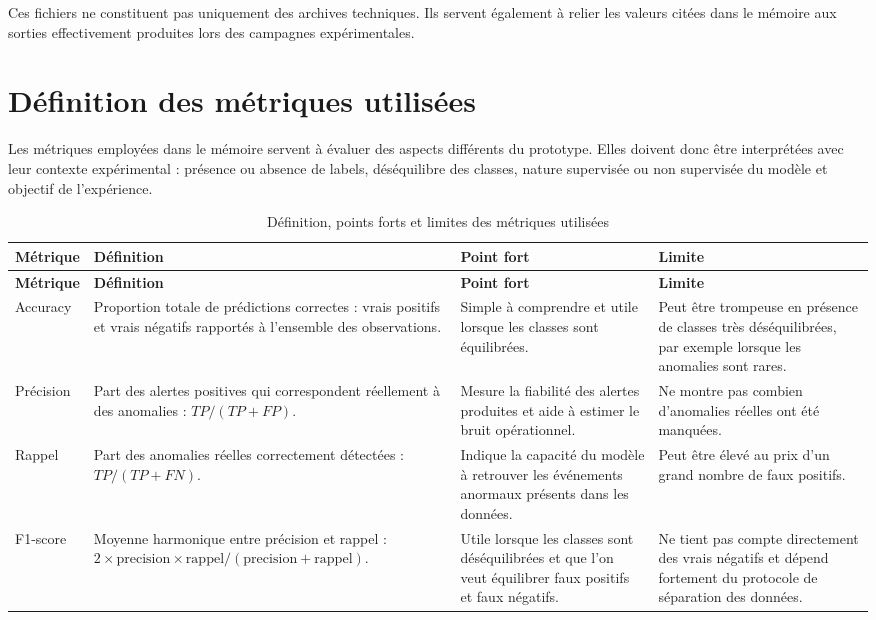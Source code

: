 Ces fichiers ne constituent pas uniquement des archives techniques. Ils servent également à relier les valeurs citées dans le mémoire aux sorties effectivement produites lors des campagnes expérimentales.


\section{Définition des métriques utilisées}

Les métriques employées dans le mémoire servent à évaluer des aspects différents du prototype. Elles doivent donc être interprétées avec leur contexte expérimental : présence ou absence de labels, déséquilibre des classes, nature supervisée ou non supervisée du modèle et objectif de l'expérience.

\begin{longtable}{p{2.7cm}p{4.1cm}p{3.6cm}p{3.6cm}}

\caption{Définition, points forts et limites des métriques utilisées}
\label{tab:definition-metriques}\\

\toprule
\textbf{Métrique} &
\textbf{Définition} &
\textbf{Point fort} &
\textbf{Limite} \\
\midrule
\endfirsthead

\toprule
\textbf{Métrique} &
\textbf{Définition} &
\textbf{Point fort} &
\textbf{Limite} \\
\midrule
\endhead

Accuracy &
Proportion totale de prédictions correctes : vrais positifs et vrais négatifs rapportés à l'ensemble des observations. &
Simple à comprendre et utile lorsque les classes sont équilibrées. &
Peut être trompeuse en présence de classes très déséquilibrées, par exemple lorsque les anomalies sont rares. \\

Précision &
Part des alertes positives qui correspondent réellement à des anomalies : $TP/(TP+FP)$. &
Mesure la fiabilité des alertes produites et aide à estimer le bruit opérationnel. &
Ne montre pas combien d'anomalies réelles ont été manquées. \\

Rappel &
Part des anomalies réelles correctement détectées : $TP/(TP+FN)$. &
Indique la capacité du modèle à retrouver les événements anormaux présents dans les données. &
Peut être élevé au prix d'un grand nombre de faux positifs. \\

F1-score &
Moyenne harmonique entre précision et rappel : $2 \times \mathrm{precision} \times \mathrm{rappel}/(\mathrm{precision}+\mathrm{rappel})$. &
Utile lorsque les classes sont déséquilibrées et que l'on veut équilibrer faux positifs et faux négatifs. &
Ne tient pas compte directement des vrais négatifs et dépend fortement du protocole de séparation des données. \\


\end{longtable}
